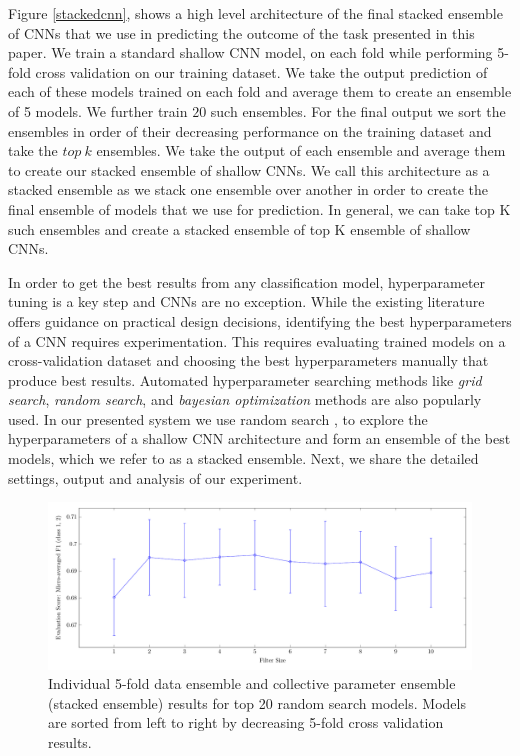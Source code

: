 \documentclass[conference]{IEEEtran}
\begin{document}
Figure \ref{stackedcnn}, shows a high level architecture of the final stacked ensemble of CNNs that we use in predicting the outcome of the task presented in this paper. We train a standard shallow CNN model, on each fold while performing 5-fold cross validation on our training dataset. We take the output prediction of each of these models trained on each fold and average them to create an ensemble of 5 models. We further train $20$ such ensembles. For the final output we sort the ensembles in order of their decreasing performance on the training dataset and take the $top \ k$ ensembles. We take the output of each ensemble and average them to create our stacked ensemble of shallow CNNs.  We call this architecture as a stacked ensemble as we stack one ensemble over another in order to create the final ensemble of models that we use for prediction. In general, we can take top K such ensembles and create a stacked ensemble of top K ensemble of shallow CNNs.

In order to get the best results from any classification model, hyperparameter tuning is a key step and CNNs are no exception. While the existing literature offers guidance on practical design decisions, identifying the best hyperparameters of a CNN requires experimentation. This requires evaluating trained models on a cross-validation dataset and choosing the best hyperparameters manually that produce best results. Automated hyperparameter searching methods like \textit{grid search}, \textit{random search}, and \textit{bayesian optimization} methods are also popularly used. In our presented system we use random search \cite{bergstra2012random}, to explore the hyperparameters of a shallow CNN architecture and form an ensemble of the best models, which we refer to as a stacked ensemble. Next, we share the detailed settings, output and analysis of our experiment.

\begin{figure}[htbp]
	\centering
	\includegraphics[scale=0.65]{filter_plot.pdf}
	\caption{Individual 5-fold data ensemble and collective parameter ensemble (stacked ensemble) results for top 20 random search models. Models are sorted from left to right by decreasing 5-fold cross validation results. }
	\label{plot_ensemble_eval}
\end{figure}
\end{document}
